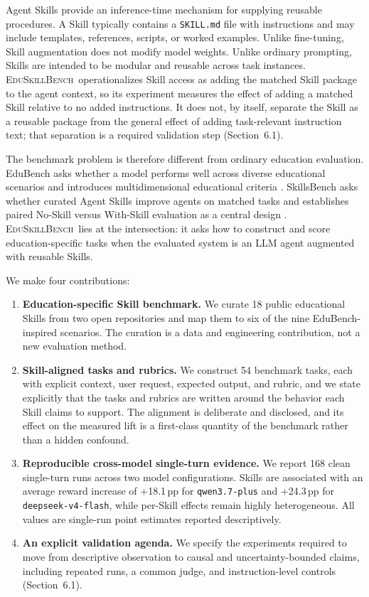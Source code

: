 \documentclass[10pt]{article}
\newcommand{\bench}{\textsc{EduSkillBench}\xspace}
\newcommand{\ppgain}[1]{+#1\,pp}
\begin{document}
Agent Skills provide an inference-time mechanism for supplying reusable procedures. A Skill typically contains a \texttt{SKILL.md} file with instructions and may include templates, references, scripts, or worked examples. Unlike fine-tuning, Skill augmentation does not modify model weights. Unlike ordinary prompting, Skills are intended to be modular and reusable across task instances. \bench~operationalizes Skill access as adding the matched Skill package to the agent context, so its experiment measures the effect of adding a matched Skill relative to no added instructions. It does not, by itself, separate the Skill as a reusable package from the general effect of adding task-relevant instruction text; that separation is a required validation step (Section~6.1).

The benchmark problem is therefore different from ordinary education evaluation. EduBench asks whether a model performs well across diverse educational scenarios and introduces multidimensional educational criteria \cite{edubench}. SkillsBench asks whether curated Agent Skills improve agents on matched tasks and establishes paired No-Skill versus With-Skill evaluation as a central design \cite{skillsbench}. \bench~lies at the intersection: it asks how to construct and score education-specific tasks when the evaluated system is an LLM agent augmented with reusable Skills.

We make four contributions:
\begin{enumerate}
  \item \textbf{Education-specific Skill benchmark.} We curate 18 public educational Skills from two open repositories and map them to six of the nine EduBench-inspired scenarios. The curation is a data and engineering contribution, not a new evaluation method.
  \item \textbf{Skill-aligned tasks and rubrics.} We construct 54 benchmark tasks, each with explicit context, user request, expected output, and rubric, and we state explicitly that the tasks and rubrics are written around the behavior each Skill claims to support. The alignment is deliberate and disclosed, and its effect on the measured lift is a first-class quantity of the benchmark rather than a hidden confound.
  \item \textbf{Reproducible cross-model single-turn evidence.} We report 168 clean single-turn runs across two model configurations. Skills are associated with an average reward increase of \ppgain{18.1} for \texttt{qwen3.7-plus} and \ppgain{24.3} for \texttt{deepseek-v4-flash}, while per-Skill effects remain highly heterogeneous. All values are single-run point estimates reported descriptively.
  \item \textbf{An explicit validation agenda.} We specify the experiments required to move from descriptive observation to causal and uncertainty-bounded claims, including repeated runs, a common judge, and instruction-level controls (Section~6.1).
\end{enumerate}
\end{document}
